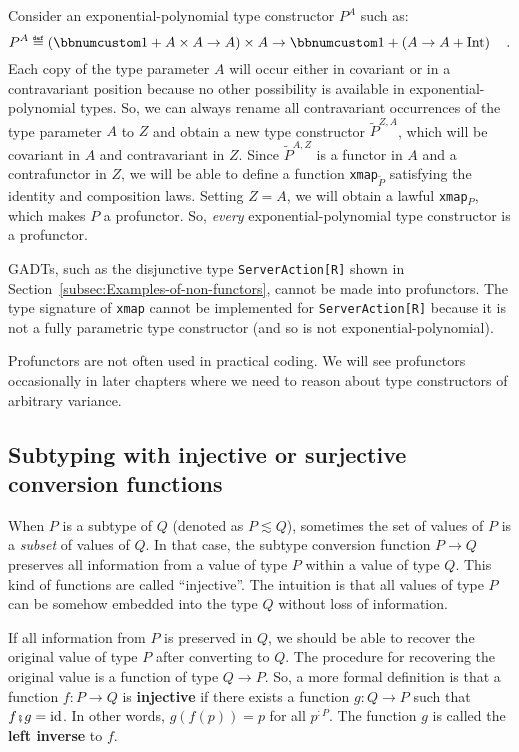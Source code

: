 Consider an exponential-polynomial type constructor $P^{A}$ such
as:
\[
P^{A}\triangleq\left(\bbnum 1+A\times A\rightarrow A\right)\times A\rightarrow\bbnum 1+\left(A\rightarrow A+\text{Int}\right)\quad.
\]
Each copy of the type parameter $A$ will occur either in covariant
or in a contravariant position because no other possibility is available
in exponential-polynomial types. So, we can always rename all contravariant
occurrences of the type parameter $A$ to $Z$ and obtain a new type
constructor $\tilde{P}^{Z,A}$, which will be covariant in $A$ and
contravariant in $Z$. Since $\tilde{P}^{A,Z}$ is a functor in $A$
and a contrafunctor in $Z$, we will be able to define a function
\lstinline!xmap!$_{\tilde{P}}$ satisfying the identity and composition
laws. Setting $Z=A$, we will obtain a lawful \lstinline!xmap!$_{P}$,
which makes $P$ a profunctor. So, \emph{every} exponential-polynomial
type constructor is a profunctor.

GADTs, such as the disjunctive type \lstinline!ServerAction[R]!
shown in Section~\ref{subsec:Examples-of-non-functors}, cannot be
made into profunctors. The type signature of \lstinline!xmap! cannot
be implemented for \lstinline!ServerAction[R]! because it is not
a fully parametric type constructor (and so is not exponential-polynomial).

Profunctors are not often used in practical coding. We will see profunctors
occasionally in later chapters where we need to reason about type
constructors of arbitrary variance.

\subsection{Subtyping with injective or surjective conversion functions\label{subsec:Subtyping-with-injective}}

When $P$ is a subtype of $Q$ (denoted as $P\lesssim Q$), sometimes
the set of values of $P$ is a \emph{subset} of values of $Q$. In
that case, the subtype conversion function
$P\rightarrow Q$ preserves all information from a value of type $P$
within a value of type $Q$. This kind of functions are called \textsf{``}injective\textsf{''}.
The intuition is that all values of type $P$ can be somehow embedded
into the type $Q$ without loss of information.

If all information from $P$ is preserved in $Q$, we should be able
to recover the original value of type $P$ after converting to $Q$.
The procedure for recovering the original value is a function of type
$Q\rightarrow P$. So, a more formal definition is that a function
$f:P\rightarrow Q$ is \textbf{injective}
if there exists a function $g:Q\rightarrow P$ such that $f\bef g=\text{id}$.
In other words, $g(f(p))=p$ for all $p^{:P}$. The function $g$
is called the \textbf{left inverse} to $f$. 

